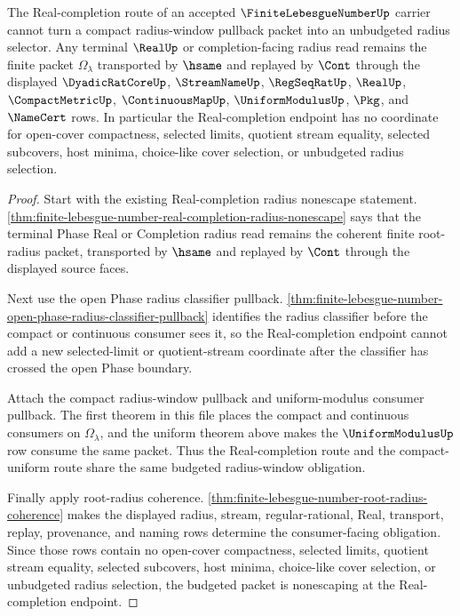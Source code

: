 \begin{theorem}
\label{thm:finite-lebesgue-number-budgeted-real-completion-nonescape}
The Real-completion route of an accepted $\FiniteLebesgueNumberUp$ carrier cannot turn a compact radius-window pullback packet into an unbudgeted radius selector. Any terminal $\RealUp$ or completion-facing radius read remains the finite packet $\Omega_{\lambda}$ transported by $\hsame$ and replayed by $\Cont$ through the displayed $\DyadicRatCoreUp$, $\StreamNameUp$, $\RegSeqRatUp$, $\RealUp$, $\CompactMetricUp$, $\ContinuousMapUp$, $\UniformModulusUp$, $\Pkg$, and $\NameCert$ rows. In particular the Real-completion endpoint has no coordinate for open-cover compactness, selected limits, quotient stream equality, selected subcovers, host minima, choice-like cover selection, or unbudgeted radius selection.
\end{theorem}
\begin{proof}
Start with the existing Real-completion radius nonescape statement. \autoref{thm:finite-lebesgue-number-real-completion-radius-nonescape} says that the terminal Phase Real or Completion radius read remains the coherent finite root-radius packet, transported by $\hsame$ and replayed by $\Cont$ through the displayed source faces.

Next use the open Phase radius classifier pullback. \autoref{thm:finite-lebesgue-number-open-phase-radius-classifier-pullback} identifies the radius classifier before the compact or continuous consumer sees it, so the Real-completion endpoint cannot add a new selected-limit or quotient-stream coordinate after the classifier has crossed the open Phase boundary.

Attach the compact radius-window pullback and uniform-modulus consumer pullback. The first theorem in this file places the compact and continuous consumers on $\Omega_{\lambda}$, and the uniform theorem above makes the $\UniformModulusUp$ row consume the same packet. Thus the Real-completion route and the compact-uniform route share the same budgeted radius-window obligation.

Finally apply root-radius coherence. \autoref{thm:finite-lebesgue-number-root-radius-coherence} makes the displayed radius, stream, regular-rational, Real, transport, replay, provenance, and naming rows determine the consumer-facing obligation. Since those rows contain no open-cover compactness, selected limits, quotient stream equality, selected subcovers, host minima, choice-like cover selection, or unbudgeted radius selection, the budgeted packet is nonescaping at the Real-completion endpoint.
\end{proof}
